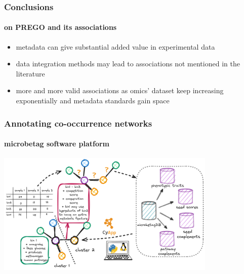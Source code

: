 \documentclass{beamer}
\begin{document}
   \begin{frame}
      \frametitle{Conclusions}
      \framesubtitle{on PREGO and its associations}

      \small
      \begin{itemize}
         \item metadata can give substantial added value in experimental data
         \item data integration methods may lead to associations not mentioned in the literature
         \item more and more valid associations as omics' dataset keep increasing exponentially and metadata standards gain space
      \end{itemize}
   \end{frame}
   \fi 


   \begin{frame}
      \frametitle{Annotating co-occurrence networks}
      \framesubtitle{microbetag software platform}

      

      \includegraphics[width=105mm]{resources/abstract_microbetag.png}
   \end{frame}
\end{document}

